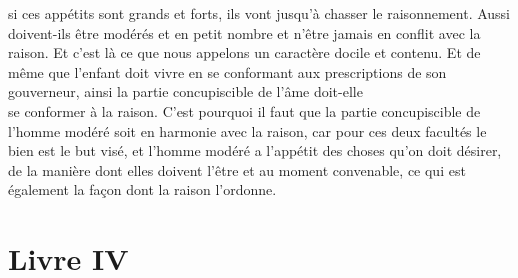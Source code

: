\documentclass[french,twoside]{book} %
\begin{document}
si ces appétits sont grands et forts, ils vont jusqu’à chasser le raisonnement. Aussi doivent-ils être modérés et en petit nombre et n’être jamais en conflit avec la raison. Et c’est là ce que nous appelons un caractère docile et contenu. Et de même que l’enfant doit vivre en se conformant aux prescriptions de son gouverneur, ainsi la partie concupiscible de l’âme doit-elle \\
se conformer à la raison. C’est pourquoi il faut que la partie concupiscible de l’homme modéré soit en harmonie avec la raison, car pour ces deux facultés le bien est le but visé, et l’homme modéré a l’appétit des choses qu’on doit désirer, de la manière dont elles doivent l’être et au moment convenable, ce qui est également la façon dont la raison l’ordonne.
\section[{Livre IV}]{Livre IV}\renewcommand{\leftmark}{Livre IV}
\end{document}
